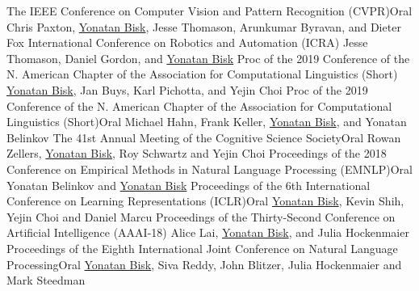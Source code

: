 \documentclass[10pt,letter]{moderncv}
\newcommand{\YB}{\underline{Yonatan Bisk}}
\begin{document}
  {The IEEE Conference on Computer Vision and Pattern Recognition (CVPR)}{Oral}{}
\pub{--}
  {\href{https://arxiv.org/abs/1903.08309}{\color{linkcolor}{Prospection: Interpretable Plans From Language By Predicting the Future}}}
  {Chris Paxton, \YB{}, Jesse Thomason, Arunkumar Byravan, and Dieter Fox}
  {International Conference on Robotics and Automation (ICRA)}{}{}
\pub{--}
  {\href{https://arxiv.org/abs/1811.00613}{\color{linkcolor}{Shifting the Baseline: Single Modality Performance on Visual Navigation \& QA}}}
  {Jesse Thomason, Daniel Gordon, and \YB{}}
  {Proc of the 2019 Conference of the N. American Chapter of the Association for Computational Linguistics (Short)}{}{}
\pub{--}
  {\href{https://www.aclweb.org/anthology/N19-1412}{\color{linkcolor}{Benchmarking Hierarchical Script Knowledge}}}
  {\YB{}, Jan Buys, Karl Pichotta, and Yejin Choi}
  {Proc of the 2019 Conference of the N. American Chapter of the Association for Computational Linguistics (Short)}{Oral}{}
\pub{--}
  {\href{https://arxiv.org/abs/1902.00595}{\color{linkcolor}{Character-based Surprisal as a Model of Human Reading in the Presence of Errors}}}
  {Michael Hahn, Frank Keller, \YB{}, and Yonatan Belinkov}
  {The 41st Annual Meeting of the Cognitive Science Society}{Oral}{}
  {\href{http://rowanzellers.com/swag/}{\color{linkcolor}{SWAG: A Large-Scale Adversarial Dataset for Grounded Commonsense Inference}}}
  {Rowan Zellers, \YB{}, Roy Schwartz and Yejin Choi}
  {Proceedings of the 2018 Conference on Empirical Methods in Natural Language Processing (EMNLP)}{Oral}{}
\pub{--}
  {\href{https://arxiv.org/abs/1711.02173}{\color{linkcolor}{Synthetic and Natural Noise Both Break Neural Machine Translation}}}
  {Yonatan Belinkov and \YB{}}
  {Proceedings of the 6th International Conference on Learning Representations (ICLR)}{Oral}{}
\pub{--}
  {\href{http://yonatanbisk.com/papers/2018-AAAI.pdf}{\color{linkcolor}{Learning Interpretable Spatial Operations in a Rich 3D Blocks World}}}
  {\YB{}, Kevin Shih, Yejin Choi and Daniel Marcu}
  {Proceedings of the Thirty-Second Conference on Artificial Intelligence (AAAI-18) }{}{}
  {\href{https://arxiv.org/abs/1710.02925}{\color{linkcolor}{Natural Language Inference from Multiple Premises}}}
  {Alice Lai, \YB{}, and Julia Hockenmaier}
  {Proceedings of the Eighth International Joint Conference on Natural Language Processing}{Oral}{}
  {\href{http://yonatanbisk.com/papers/2016-EMNLP.pdf}{\color{linkcolor}{Evaluating Induced CCG Parsers on Grounded Semantic Parsing}}}
{\YB{}, Siva Reddy, John Blitzer, Julia Hockenmaier and Mark Steedman}
\end{document}
